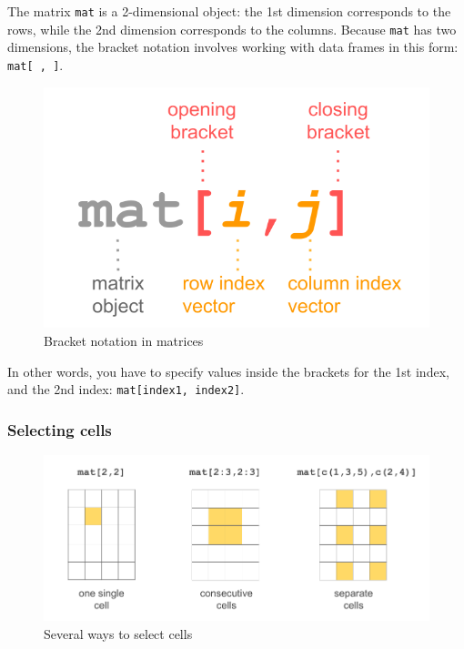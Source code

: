 \documentclass[
]{book}
\begin{document}
The matrix \texttt{mat} is a 2-dimensional object: the 1st dimension corresponds
to the rows, while the 2nd dimension corresponds to the columns.
Because \texttt{mat} has two dimensions, the bracket notation involves
working with data frames in this form: \texttt{mat{[}\ ,\ {]}}.

\begin{figure}

{\centering \includegraphics[width=0.5\linewidth]{images/objects/obj-matrix-brackets} 

}

\caption{Bracket notation in matrices}\label{fig:unnamed-chunk-121}
\end{figure}

In other words, you have to specify values inside the
brackets for the 1st index, and the 2nd index: \texttt{mat{[}index1,\ index2{]}}.

\hypertarget{selecting-cells}{%
\subsubsection*{Selecting cells}\label{selecting-cells}}

\begin{figure}

{\centering \includegraphics[width=0.8\linewidth]{images/objects/obj-matrix-cells1} 

}

\caption{Several ways to select cells}\label{fig:unnamed-chunk-122}
\end{figure}
\end{document}
